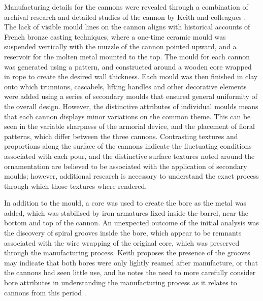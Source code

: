 \documentclass[review]{elsarticle}
\begin{document}
Manufacturing details for the cannons were revealed through a combination of archival research and detailed studies of the cannon by Keith and colleagues \citep[359-367]{RN5763}. The lack of visible mould lines on the cannon aligns with historical accounts of French bronze casting techniques, where a one-time ceramic mould was suspended vertically with the muzzle of the cannon pointed upward, and a reservoir for the molten metal mounted to the top. The mould for each cannon was generated using a pattern, and constructed around a wooden core wrapped in rope to create the desired wall thickness. Each mould was then finished in clay onto which trunnions, cascabels, lifting handles and other decorative elements were added using a series of secondary moulds that ensured general uniformity of the overall design. However, the distinctive attributes of individual moulds means that each cannon displays minor variations on the common theme. This can be seen in the variable sharpness of the armorial device, and the placement of floral patterns, which differ between the three cannons. Contrasting textures and proportions along the surface of the cannons indicate the fluctuating conditions associated with each pour, and the distinctive surface textures noted around the ornamentation are believed to be associated with the application of secondary moulds; however, additional research is necessary to understand the exact process through which those textures where rendered.

In addition to the mould, a core was used to create the bore as the metal was added, which was stabilised by iron armatures fixed inside the barrel, near the bottom and top of the cannon. An unexpected outcome of the initial analysis was the discovery of spiral grooves inside the bore, which appear to be remnants associated with the wire wrapping of the original core, which was preserved through the manufacturing process. Keith proposes the presence of the grooves may indicate that both bores were only lightly reamed after manufacture, or that the cannons had seen little use, and he notes the need to more carefully consider bore attributes in understanding the manufacturing process as it relates to cannons from this period \citep[366]{RN5763}.
\end{document}
